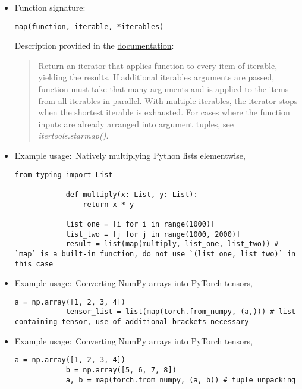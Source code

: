 \documentclass[12pt, a4paper]{article}
\numberwithin{equation}{section}
\theoremstyle{definition}
\theoremstyle{definition}
\begin{document}
	\begin{itemize}
		\item Function signature:
		
		\begin{lstlisting}[style=mystylepython, label=alg:map__func_signa, xleftmargin=\parindent]
			map(function, iterable, *iterables)
		\end{lstlisting}
		
		Description provided in the \href{https://docs.python.org/3/library/functions.html#map}{documentation}:
		
		\begin{quote}
			Return an iterator that applies function to every item of iterable, yielding the results. If additional iterables arguments are passed, function must take that many arguments and is applied to the items from all iterables in parallel. With multiple iterables, the iterator stops when the shortest iterable is exhausted. For cases where the function inputs are already arranged into argument tuples, see \textit{itertools.starmap()}.
		\end{quote}		
		
		\item Example usage:~Natively multiplying Python lists elementwise,
		
		\begin{lstlisting}[style=mystylepython, label=alg:map__python_lists_elementwise, xleftmargin=\parindent]
			from typing import List
			
			def multiply(x: List, y: List):
			    return x * y
			
			list_one = [i for i in range(1000)]
			list_two = [j for j in range(1000, 2000)]
			result = list(map(multiply, list_one, list_two)) # `map` is a built-in function, do not use `(list_one, list_two)` in this case
		\end{lstlisting}
		
		\item Example usage:~Converting NumPy arrays into PyTorch tensors,
		
		\begin{lstlisting}[style=mystylepython, label=alg:map__numpy_torch_conv, xleftmargin=\parindent]
			a = np.array([1, 2, 3, 4])
			tensor_list = list(map(torch.from_numpy, (a,))) # list containing tensor, use of additional brackets necessary
		\end{lstlisting}
	
		\item Example usage:~Converting NumPy arrays into PyTorch tensors,
		
		\begin{lstlisting}[style=mystylepython, label=alg:map__numpy_torch_tuple_unpacking, xleftmargin=\parindent]
			a = np.array([1, 2, 3, 4]) 
			b = np.array([5, 6, 7, 8]) 
			a, b = map(torch.from_numpy, (a, b)) # tuple unpacking
		\end{lstlisting}
		
	\end{itemize}
	
\end{document}
